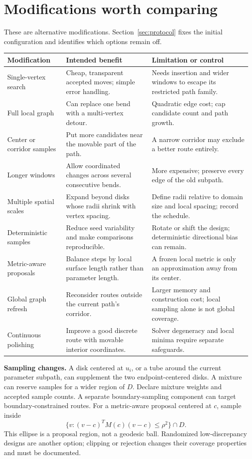 \documentclass[11pt,letterpaper]{article}
\begin{document}
\clearpage
\section{Modifications worth comparing}
These are alternative modifications. Section~\ref{sec:protocol} fixes the initial configuration and identifies which options remain off.

\renewcommand{\arraystretch}{1.16}
\begin{tabularx}{\textwidth}{@{}>{\raggedright\arraybackslash}p{}>{\raggedright\arraybackslash}X>{\raggedright\arraybackslash}X@{}}
\toprule
Modification & Intended benefit & Limitation or control \\
\midrule
Single-vertex search & Cheap, transparent accepted moves; simple error handling. & Needs insertion and wider windows to escape its restricted path family. \\
Full local graph & Can replace one bend with a multi-vertex detour. & Quadratic edge cost; cap candidate count and path growth. \\
Center or corridor samples & Put more candidates near the movable part of the path. & A narrow corridor may exclude a better route entirely. \\
Longer windows & Allow coordinated changes across several consecutive bends. & More expensive; preserve every edge of the old subpath. \\
Multiple spatial scales & Expand beyond disks whose radii shrink with vertex spacing. & Define radii relative to domain size and local spacing; record the schedule. \\
Deterministic samples & Reduce seed variability and make comparisons reproducible. & Rotate or shift the design; deterministic directional bias can remain. \\
Metric-aware proposals & Balance steps by local surface length rather than parameter length. & A frozen local metric is only an approximation away from its center. \\
Global graph refresh & Reconsider routes outside the current path's corridor. & Larger memory and construction cost; local sampling alone is not global coverage. \\
Continuous polishing & Improve a good discrete route with movable interior coordinates. & Solver degeneracy and local minima require separate safeguards. \\
\bottomrule
\end{tabularx}

\textbf{Sampling changes.} A disk centered at $u_i$, or a tube around the current parameter subpath, can supplement the two endpoint-centered disks. A mixture can reserve samples for a wider region of $D$. Declare mixture weights and accepted sample counts. A separate boundary-sampling component can target boundary-constrained routes. For a metric-aware proposal centered at $c$, sample inside
\[
 \{v:(v-c)^TM(c)(v-c)\le\rho^2\}\cap D.
\]
This ellipse is a proposal region, not a geodesic ball. Randomized low-discrepancy designs are another option; clipping or rejection changes their coverage properties and must be documented.
\end{document}
